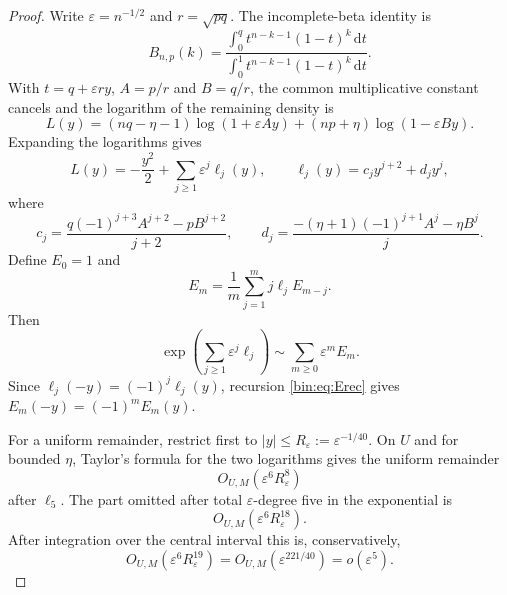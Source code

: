 \documentclass[11pt,a4paper]{article}
\numberwithin{equation}{section}
\theoremstyle{definition}
\theoremstyle{remark}
\newcommand{\dd}{\,\mathrm d}
\newcommand{\eps}{\varepsilon}
\begin{document}
\begin{proof}
Write $\eps=n^{-1/2}$ and $r=\sqrt{pq}$.  The incomplete-beta identity is
\[
 B_{n,p}(k)
 =\frac{\int_0^q t^{n-k-1}(1-t)^k\dd t}
 {\int_0^1 t^{n-k-1}(1-t)^k\dd t}.
\]
With $t=q+\eps r y$, $A=p/r$ and $B=q/r$, the common multiplicative
constant cancels and the logarithm of the remaining density is
\begin{equation}\label{bin:eq:L}
 L(y)=(nq-\eta-1)\log(1+\eps Ay)
 +(np+\eta)\log(1-\eps By).
\end{equation}
Expanding the logarithms gives
\begin{equation}\label{bin:eq:ell}
 L(y)=-\frac{y^2}{2}+\sum_{j\ge1}\eps^j\ell_j(y),
 \qquad
 \ell_j(y)=c_jy^{j+2}+d_jy^j,
\end{equation}
where
\[
 c_j=\frac{q(-1)^{j+3}A^{j+2}-pB^{j+2}}{j+2},
 \qquad
 d_j=\frac{-(\eta+1)(-1)^{j+1}A^j-\eta B^j}{j}.
\]
Define $E_0=1$ and
\begin{equation}\label{bin:eq:Erec}
 E_m=\frac1m\sum_{j=1}^m j\ell_jE_{m-j}.
\end{equation}
Then
\[
 \exp\left(\sum_{j\ge1}\eps^j\ell_j\right)
 \sim\sum_{m\ge0}\eps^mE_m.
\]
Since $\ell_j(-y)=(-1)^j\ell_j(y)$, recursion
\eqref{bin:eq:Erec} gives $E_m(-y)=(-1)^mE_m(y)$.

For a uniform remainder, restrict first to
$|y|\le R_\eps:=\eps^{-1/40}$.  On $U$ and for bounded $\eta$, Taylor's
formula for the two logarithms gives the uniform remainder
\[
 O_{U,M}(\eps^6R_\eps^8)
\]
after $\ell_5$.  The part omitted after total $\eps$-degree five in the
exponential is
\[
 O_{U,M}(\eps^6R_\eps^{18}).
\]
After integration over the central interval this is, conservatively,
\[
 O_{U,M}(\eps^6R_\eps^{19})
 =O_{U,M}(\eps^{221/40})=o(\eps^5).
\]


\end{proof}
\end{document}
